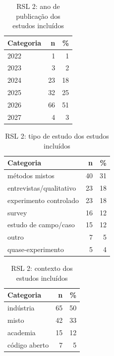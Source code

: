\begin{table}[htbp]
\centering
\caption{RSL 2: ano de publicação dos estudos incluídos}
\label{tab:map-rsl2-anodepublica}
\small
\begin{tabular}{p{8cm}rr}
\hline
\textbf{Categoria} & \textbf{n} & \textbf{\%} \\
\hline
2022 & 1 & 1 \\
2023 & 3 & 2 \\
2024 & 23 & 18 \\
2025 & 32 & 25 \\
2026 & 66 & 51 \\
2027 & 4 & 3 \\
\hline
\end{tabular}
\end{table}
\begin{table}[htbp]
\centering
\caption{RSL 2: tipo de estudo dos estudos incluídos}
\label{tab:map-rsl2-tipodeestudo}
\small
\begin{tabular}{p{8cm}rr}
\hline
\textbf{Categoria} & \textbf{n} & \textbf{\%} \\
\hline
métodos mistos & 40 & 31 \\
entrevistas/qualitativo & 23 & 18 \\
experimento controlado & 23 & 18 \\
survey & 16 & 12 \\
estudo de campo/caso & 15 & 12 \\
outro & 7 & 5 \\
quase-experimento & 5 & 4 \\
\hline
\end{tabular}
\end{table}
\begin{table}[htbp]
\centering
\caption{RSL 2: contexto dos estudos incluídos}
\label{tab:map-rsl2-contextoqp}
\small
\begin{tabular}{p{8cm}rr}
\hline
\textbf{Categoria} & \textbf{n} & \textbf{\%} \\
\hline
indústria & 65 & 50 \\
misto & 42 & 33 \\
academia & 15 & 12 \\
código aberto & 7 & 5 \\
\hline
\end{tabular}
\end{table}
